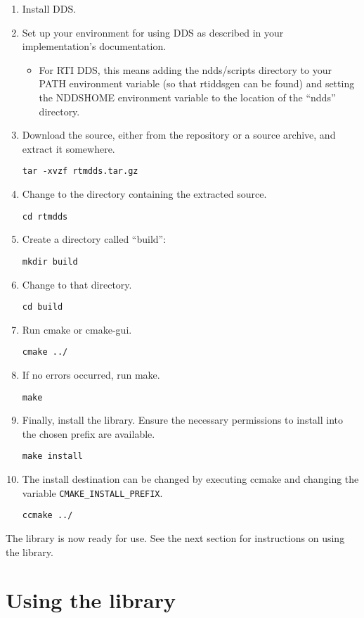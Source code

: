 \documentclass[a4paper,10pt]{article}
\newcommand{\ilcode}[1]{\lstinline|#1|}
\begin{document}
\begin{enumerate}
  \item Install DDS.

  \item Set up your environment for using DDS as described in your
  implementation's documentation.
  \begin{itemize}
    \item For RTI DDS, this means adding the ndds/scripts directory to
    your PATH environment variable (so that rtiddsgen can be found) and
    setting the NDDSHOME environment variable to the location of the
    ``ndds'' directory.
  \end{itemize}

  \item Download the source, either from the repository or a source archive,
  and extract it somewhere.

  \ilcode{tar -xvzf rtmdds.tar.gz}
  \item Change to the directory containing the extracted source.

  \ilcode{cd rtmdds}
  \item Create a directory called ``build'':

  \ilcode{mkdir build}
  \item Change to that directory.

  \ilcode{cd build}
  \item Run cmake or cmake-gui.

  \ilcode{cmake ../}
  \item If no errors occurred, run make.

  \ilcode{make}
  \item Finally, install the library. Ensure the necessary permissions
  to install into the chosen prefix are available.

  \ilcode{make install}
  \item The install destination can be changed by executing ccmake and
  changing the variable \ilcode{CMAKE_INSTALL_PREFIX}.

  \ilcode{ccmake ../}
\end{enumerate}

The library is now ready for use. See the next section for instructions on
using the library.

\section{Using the library}
\label{sec:usage}
\end{document}
